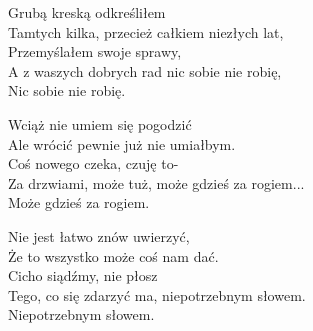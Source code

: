 \begin{text}
    Grubą kreską odkreśliłem\\
    Tamtych kilka, przecież całkiem niezłych lat,\\
    Przemyślałem swoje sprawy,\\
    A z waszych dobrych rad nic sobie nie robię,\\
    Nic sobie nie robię.

    Wciąż nie umiem się pogodzić\\
    Ale wrócić pewnie już nie umiałbym.\\
    Coś nowego czeka, czuję to-\\
    Za drzwiami, może tuż, może gdzieś za rogiem...\\
    Może gdzieś za rogiem.

    Nie jest łatwo znów uwierzyć,\\
    Że to wszystko może coś nam dać.\\
    Cicho siądźmy, nie płosz\\
    Tego, co się zdarzyć ma, niepotrzebnym słowem.\\
    Niepotrzebnym słowem.
\end{text}
\begin{chord}

\end{chord}